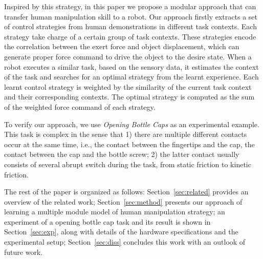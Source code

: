 Inspired by this strategy, in this paper we propose a modular approach that can transfer human manipulation skill to a robot.
Our approach firstly extracts a set of control strategies from human demonstrations in different task contexts. Each strategy take charge of a certain group of task contexts. These strategies encode the correlation between the exert force and object displacement, which can generate proper force command to drive the object to the desire state.
When a robot executes a similar task, based on the sensory data, it estimates the context of the task and searches for an optimal strategy from the learnt experience. Each learnt control strategy is weighted by the similarity of the current task context and their corresponding contexts. The optimal strategy is computed as the sum of the weighted force command of each strategy. 


To verify our approach, we use \emph{Opening Bottle Caps} as an experimental example. This task is complex in the sense that 1) there are multiple different contacts occur at the same time, i.e., the contact between the fingertips and the cap, the contact between the cap and the bottle screw; 2) the latter contact usually consists of several abrupt switch during the task, from static friction to kinetic friction.

The rest of the paper is organized as follows: Section~\ref{sec:related} provides an overview of the related work; Section~\ref{sec:method} presents our approach of learning a multiple module model of human manipulation strategy; an experiment of a opening bottle cap task and its result is shown in Section~\ref{sec:exp}, along with details of the hardware specifications and the experimental setup; Section~\ref{sec:diss} concludes this work with an outlook of future work. 